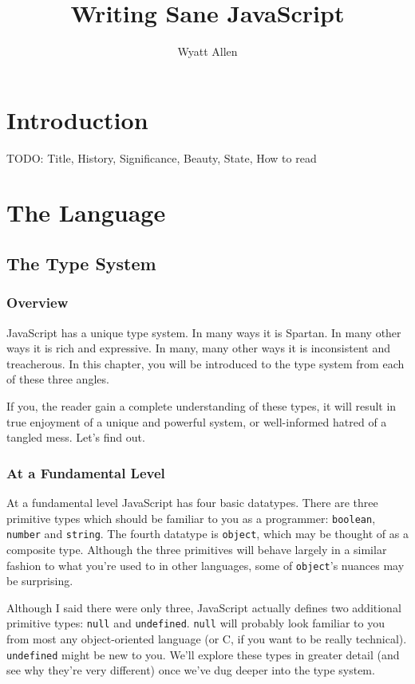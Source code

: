 \documentclass[11pt,letter]{book}
\begin{document}
    \title{Writing Sane JavaScript}
    \author{Wyatt Allen}
    \maketitle
    
    \part{Introduction}
    TODO: Title, History, Significance, Beauty, State, How to read
    
    \part{The Language}
    \chapter{The Type System}
    \section{Overview}
    JavaScript has a unique type system. In many ways it is Spartan. In many other ways 
    it is rich and expressive. In many, many other ways it is inconsistent and treacherous.
    In this chapter, you will be introduced to the type system from each of these three 
    angles.
    
    If you, the reader gain a complete understanding of these types, it will result in 
    true enjoyment of a unique and powerful system, or well-informed hatred of a tangled 
    mess. Let's find out.
    
    \section{At a Fundamental Level}
    At a fundamental level JavaScript has four basic datatypes. There are three primitive 
    types which should be familiar to you as a programmer: \texttt{boolean}, \texttt{number} 
    and \texttt{string}. The fourth datatype is \texttt{object}, which may be thought of as a 
    composite type. Although the three primitives will behave largely in a similar 
    fashion to what you're used to in other languages, some of \texttt{object}'s nuances 
    may be surprising.
    
    Although I said there were only three, JavaScript actually defines two additional primitive 
    types: \texttt{null} and \texttt{undefined}. \texttt{null} will probably look familiar to 
    you from most any object-oriented language (or C, if you want to be really technical). 
    \texttt{undefined} might be new to you. We'll explore these types in greater detail (and 
    see why they're very different) once we've dug deeper into the type system.
    
\end{document}

